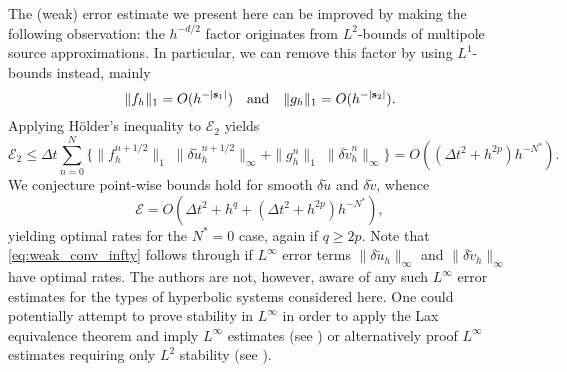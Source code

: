 The (weak) error estimate we present here can be improved by making the following observation: the $h^{-d/2}$ factor originates from $L^2$-bounds of multipole source approximations.
In particular, we can remove this factor by using $L^1$-bounds instead, mainly
\[
	\| f_h\|_1 = O(h^{-|\mathbf s_1|}) \quad {\rm and} \quad \|g_h\|_1 = O(h^{-|\mathbf s_2|}).
\] 
Applying H\"older's inequality to $\mathcal E_2$ yields
\begin{equation}
\label{eq:weak_conv_infty}
	\mathcal E_2 \le \Delta t \sum_{n=0}^N \Big\{ \|f_h^{n+1/2}\|_1 \; \|\delta \tilde u_h^{n+1/2}\|_{\infty}
								+ \|g_h^{n}\|_1  \; \| \delta \tilde v_h^n\|_{\infty} \Big\}
					= O((\Delta t^2+h^{2p})h^{-N^*}).
\end{equation}
We conjecture point-wise bounds hold for smooth $\delta \tilde u$ and $\delta \tilde v$, whence
\begin{equation}\label{eq:conjecture}
	\mathcal E = O(\Delta t^2 +h^q + (\Delta t^2+h^{2p})h^{-N^*}),
\end{equation}
yielding optimal rates for the $N^*=0$ case, again if $q\ge2p$.
Note that \ref{eq:weak_conv_infty} follows through if $L^\infty$ error terms $\|\delta \tilde u_h\|_\infty$ and $\|\delta \tilde v_h\|_\infty$ have optimal rates.
The authors are not, however, aware of any such $L^\infty$ error estimates for the types of hyperbolic systems considered here. 
One could potentially attempt to prove stability in $L^\infty$ in order to apply the Lax equivalence theorem and imply $L^\infty$ estimates (see \cite{Brenner:06}) or alternatively  
proof $L^\infty$ estimates requiring only $L^2$ stability (see \cite{Layton:82}).






